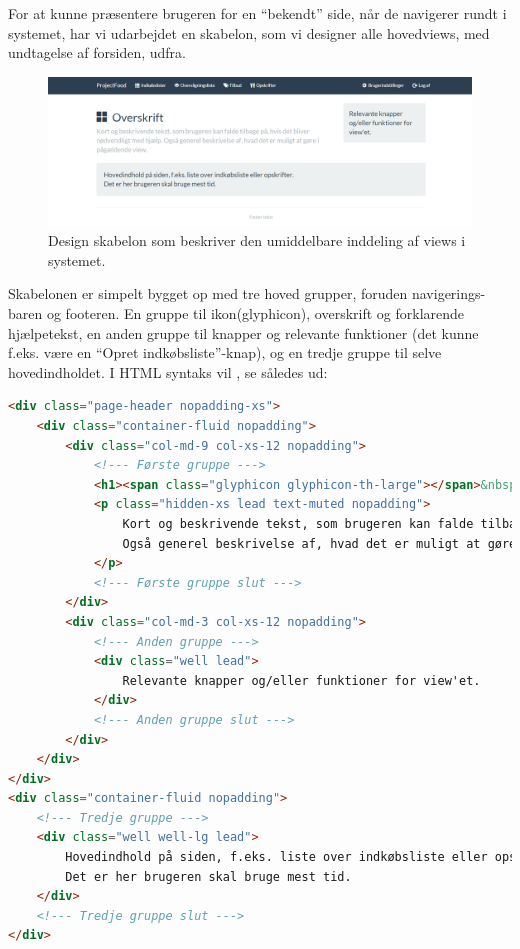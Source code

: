For at kunne præsentere brugeren for en ``bekendt'' side, når de navigerer rundt i systemet, har vi udarbejdet en skabelon, som vi designer alle hovedviews, med undtagelse af forsiden, udfra.
\begin{figure}[h]
\includegraphics[trim=3.5cm 0cm 3cm 0cm, clip=true, width=1\textwidth]{images/Images/generelt_layout.png}
\caption{Design skabelon som beskriver den umiddelbare inddeling af views i systemet.}\label{ss:design_skabelon}
\end{figure}
Skabelonen er simpelt bygget op med tre hoved grupper, foruden navigerings-baren og footeren. En gruppe til ikon(glyphicon), overskrift og forklarende hjælpetekst, en anden gruppe til knapper og relevante funktioner (det kunne f.eks. være en ``Opret indkøbsliste''-knap), og en tredje gruppe til selve hovedindholdet.
I HTML syntaks vil , se således ud:
\begin{lstlisting}[language=HTML, caption=HTML-kode med de tre hoved grupper, label=html:design_skabelon]
<div class="page-header nopadding-xs">
    <div class="container-fluid nopadding">
        <div class="col-md-9 col-xs-12 nopadding">
            <!--- Første gruppe --->
            <h1><span class="glyphicon glyphicon-th-large"></span>&nbsp;&nbsp;Overskrift</h1>
            <p class="hidden-xs lead text-muted nopadding">
                Kort og beskrivende tekst, som brugeren kan falde tilbage på, hvis det bliver nødvendligt med hjælp.
                Også generel beskrivelse af, hvad det er muligt at gøre i pågældende view.
            </p>
            <!--- Første gruppe slut --->
        </div>
        <div class="col-md-3 col-xs-12 nopadding">
            <!--- Anden gruppe --->            
            <div class="well lead">
                Relevante knapper og/eller funktioner for view'et.
            </div>
            <!--- Anden gruppe slut --->
        </div>
    </div>
</div>
<div class="container-fluid nopadding">
    <!--- Tredje gruppe --->
    <div class="well well-lg lead">
        Hovedindhold på siden, f.eks. liste over indkøbsliste eller opskrifter.<br />
        Det er her brugeren skal bruge mest tid.
    </div>
    <!--- Tredje gruppe slut --->
</div>
\end{lstlisting}

